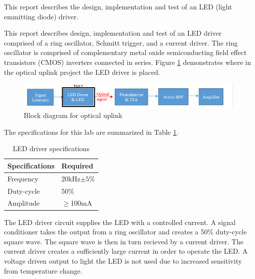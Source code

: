 




This report describes the design, implementation and test of an LED (light emmitting diode) driver. 

\noindent This report describes design, implementation and test of an LED driver comprised of a ring oscillator, Schmitt trigger, and a current driver. The ring oscillator is comprised of complementary metal oxide semiconducting field effect transistors (CMOS) inverters connected in series. Figure \ref{fig:blockdiagram2} demonstrates where in the optical uplink project the LED driver is placed. 



\begin{figure}[H]
    \centering
    \includegraphics[width=.9\textwidth ]{Introduction/Block_Diagram_MFBP.png}
    \caption{Block diagram for optical uplink \cite{b1}}
    \label{fig:blockdiagram2}
\end{figure}

The specifications for this lab are summarized in Table \ref{tab:specifications}.

\begin{table}[H]
	\centering
	\caption{LED driver specifications}
	\label{tab:specifications}
	\begin{tabular}{|l|l|}
		\hline
		Specifications & Required       \\ \hline
		Frequency      & 20kHz$\pm 5\%$ \\ \hline
		Duty-cycle     & 50\%           \\ \hline
		Amplitude      & $\geq$100mA    \\ \hline
	\end{tabular}
\end{table}


The LED driver circuit supplies the LED with a controlled current. A signal conditioner takes the output from a ring oscillator and creates a 50\% duty-cycle square wave. The square wave is then in turn recieved by a current driver. The current driver creates a sufficiently large current in order to operate the LED.  A voltage driven output to light the LED is not used due to increased sensitivity from temperature change. 




